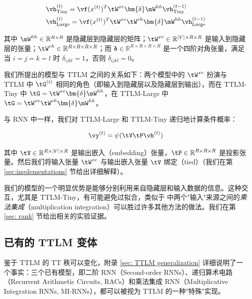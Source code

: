 \documentclass{article}
\theoremstyle{plain}
\theoremstyle{definition}
\theoremstyle{remark}
\begin{document}
\begin{equation}
\begin{split}
& \vh^{(t)}_{\textrm{Tiny}} = \vf (x^{(t)})^T \tW^{xe} \bm{\delta} \mW^{hh}\vh^{(t-1)}_{\textrm{Tiny}}\\
& \vh^{(t)}_{\textrm{Large}}  = \vf (x^{(t)})^T \tW^{xe} \tW^{eh}  \bm{\delta} \mW^{hh}\vh^{(t-1)}_{\textrm{Large}}\\
\end{split}
\end{equation}

其中 $\mW^{hh} \in \mathbb{R}^{R \times R}$ 是隐藏层到隐藏层的矩阵；$\tW^{xe} \in \mathbb{R}^{|V| \times R \times R}$ 是输入到隐藏层的张量；$\tW^{eh} \in \mathbb{R}^{R \times R \times R \times R}$；而 $\bm{\delta} \in  \mathbb{R}^{R \times R \times R \times R}$ 是一个四阶对角张量，满足当 $i = j = k = l$ 时 $\delta_{ijkl} = 1$，否则 $\delta_{ijkl} = 0$。


我们所提出的模型与 TTLM 之间的关系如下：两个模型中的 $\tW^{xe}$ 扮演与 TTLM 中 $\tG^{(t)}$ 相同的角色（即输入到隐藏层以及隐藏层到输出），而在 TTLM-Tiny 中 $\tG = \tW^{xe} \bm{\delta} \mW^{hh}$，在 TTLM-Large 中 $\tG = \tW^{xe} \tW^{eh} \bm{\delta} \mW^{hh}$。


与 RNN 中一样，我们对 TTLM-Large 和 TTLM-Tiny 递归地计算条件概率：

\begin{equation}
\vy^{(t)} = \psi (\tV\tP\vh^{(t)})
\end{equation}

其中 $\tV\in\mathbb{R}^{R \times |V|\times R}$ 是输出嵌入（embedding）张量，$\tP\in\mathbb{R}^{R \times R\times R}$ 是投影张量。然后我们将输入张量 $\tW^{xe}$ 与输出嵌入张量 $\tV$ 绑定（tied）（我们在第 \ref{sec:implementations} 节给出详细解释）。

我们的模型的一个明显优势是能够分别利用来自隐藏层和输入数据的信息。这种交互，尤其是 TTLM-Tiny，有可能避免过拟合，类似于 \cite{wu_multiplicative_2016} 中两个"输入"来源之间的\textit{乘法集成}（multiplication integration）可以胜过许多其他方法的做法。我们在第 \ref{sec: rank} 节给出相关的实验证据。



\subsection{已有的 TTLM 变体}
\label{sec: Existing  TTLM variants}
鉴于 TTLM 的 TT 秩可以变化，附录 \ref{sec: TTLM generalization} 详细说明了一个事实：三个已有模型，即二阶 RNN（Second-order RNNs）、递归算术电路（Recurrent Arithmetic Circuits, RACs）和乘法集成 RNN（Multiplicative Integration RNNs, MI-RNNs），都可以被视为 TTLM 的一种"特殊"实现。
\end{document}
